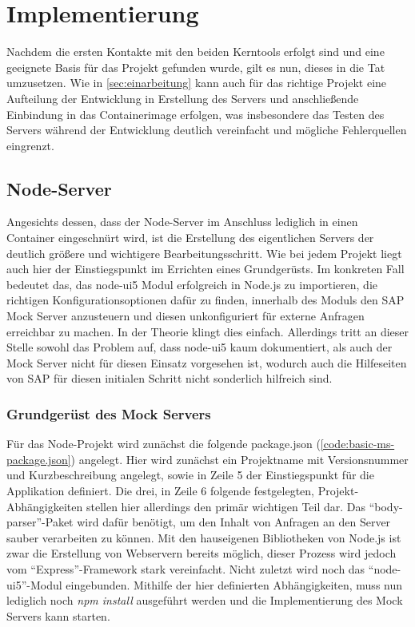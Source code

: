 \chapter{Implementierung}
Nachdem die ersten Kontakte mit den beiden Kerntools erfolgt sind und eine geeignete Basis für das Projekt gefunden wurde, gilt es nun, dieses in die Tat umzusetzen.
Wie in \autoref{sec:einarbeitung} kann auch für das richtige Projekt eine Aufteilung der Entwicklung in Erstellung des Servers und anschließende Einbindung in das Containerimage erfolgen, was insbesondere das Testen des Servers während der Entwicklung deutlich vereinfacht und mögliche Fehlerquellen eingrenzt.

\section{Node-Server}
Angesichts dessen, dass der Node-Server im Anschluss lediglich in einen Container eingeschnürt wird, ist die Erstellung des eigentlichen Servers der deutlich größere und wichtigere Bearbeitungsschritt.
Wie bei jedem Projekt liegt auch hier der Einstiegspunkt im Errichten eines Grundgerüsts.
Im konkreten Fall bedeutet das, das node-ui5 Modul erfolgreich in Node.js zu importieren, die richtigen Konfigurationsoptionen dafür zu finden, innerhalb des Moduls den SAP Mock Server anzusteuern und diesen unkonfiguriert für externe Anfragen erreichbar zu machen.
In der Theorie klingt dies einfach.
Allerdings tritt an dieser Stelle sowohl das Problem auf, dass node-ui5 kaum dokumentiert, als auch der Mock Server nicht für diesen Einsatz vorgesehen ist, wodurch auch die Hilfeseiten von SAP für diesen initialen Schritt nicht sonderlich hilfreich sind.

\subsection{Grundgerüst des Mock Servers}
Für das Node-Projekt wird zunächst die folgende package.json (\autoref{code:basic-ms-package.json}) angelegt.
Hier wird zunächst ein Projektname mit Versionsnummer und Kurzbeschreibung angelegt, sowie in Zeile 5 der Einstiegspunkt für die Applikation definiert.
Die drei, in Zeile 6 folgende festgelegten, Projekt-Abhängigkeiten stellen hier allerdings den primär wichtigen Teil dar.
Das \enquote{body-parser}-Paket wird dafür benötigt, um den Inhalt von Anfragen an den Server sauber verarbeiten zu können.
Mit den hauseigenen Bibliotheken von Node.js ist zwar die Erstellung von Webservern bereits möglich, dieser Prozess wird jedoch vom \enquote{Express}-Framework stark vereinfacht.
Nicht zuletzt wird noch das \enquote{node-ui5}-Modul eingebunden.
Mithilfe der hier definierten Abhängigkeiten, muss nun lediglich noch \emph{npm install} ausgeführt werden und die Implementierung des Mock Servers kann starten.



